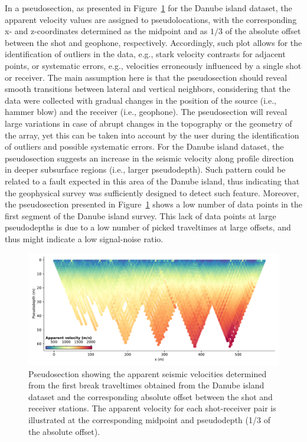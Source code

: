 \documentclass[a4paper,fleqn]{cas-sc}
\begin{document}
In a pseudosection, as presented in Figure~\ref{fig:rollalong_pseudosection} for the Danube island dataset, the apparent velocity values are assigned to pseudolocations, with the corresponding x- and z-coordinates determined as the midpoint and as $1/3$ of the absolute offset between the shot and geophone, respectively.
Accordingly, such plot allows for the identification of outliers in the data, e.g., stark velocity contrasts for adjacent points, or systematic errors, e.g., velocities erroneously influenced by a single shot or receiver. The main assumption here is that the pseudosection should reveal smooth transitions between lateral and vertical neighbors, considering that the data were collected with gradual changes in the position of the source (i.e., hammer blow) and the receiver (i.e., geophone). The pseudosection will reveal large variations in case of abrupt changes in the topography or the geometry of the array, yet this can be taken into account by the user 
during the identification of outliers and possible systematic errors.
For the Danube island dataset, the pseudosection suggests an increase in the seismic velocity along profile direction in deeper subsurface regions (i.e., larger pseudodepth). Such pattern could be related to a fault expected in this area of the Danube island, thus indicating that the geophysical survey was sufficiently designed to detect such feature.
Moreover, the pseudosection presented in Figure~\ref{fig:rollalong_pseudosection} shows a low number of data points in the first segment of the Danube island survey. This lack of data points at large pseudodepths is due to a low number of picked traveltimes at large offsets, and thus might indicate a low signal-noise ratio.
\begin{figure}
	\centering
	\includegraphics[width=.75\textwidth]{figures/rollalong_pseudosection.pdf}
	\caption{Pseudosection showing the apparent seismic velocities determined from the first break traveltimes obtained from the Danube island dataset and the corresponding absolute offset between the shot and receiver stations. The apparent velocity for each shot-receiver pair is illustrated at the corresponding midpoint and pseudodepth (1/3 of the absolute offset).}
	\label{fig:rollalong_pseudosection}
\end{figure}
\end{document}
